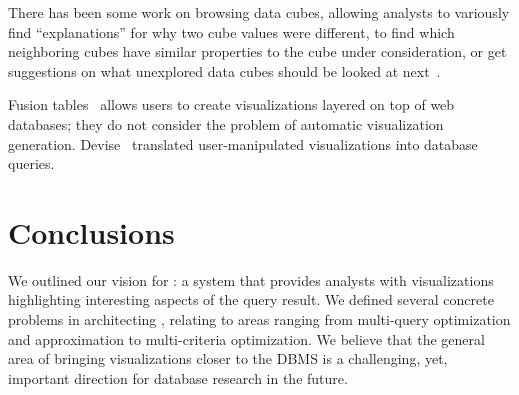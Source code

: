 \documentclass{sig-alternate}
\begin{document}
 There has been some work on browsing data cubes, allowing analysts to variously find ``explanations'' for why two cube values were different, to find which neighboring cubes have similar properties to the cube under consideration, or get suggestions on what unexplored data cubes should be looked at next~\cite{DBLP:conf/vldb/Sarawagi99, DBLP:conf/vldb/SatheS01, DBLP:conf/vldb/Sarawagi00}. 


 Fusion tables~\cite{DBLP:conf/sigmod/GonzalezHJLMSSG10} allows users to create visualizations layered on top of web databases; they do not consider the problem of automatic visualization generation. Devise~\cite{DBLP:conf/sigmod/LivnyRBCDLMW97} translated user-manipulated visualizations into database queries.  


\vspace{-3pt}
\section{Conclusions}\label{sec:conclusions}
\noindent We outlined our vision for \VizRecDB: a system that provides analysts with visualizations highlighting interesting aspects of the query result. We defined several concrete problems in architecting \VizRecDB, relating to areas ranging from multi-query optimization and approximation to multi-criteria optimization. We believe that the general area of bringing visualizations closer to the DBMS is a challenging, yet, important direction for database research in the future.


\vspace{-3pt}
{\scriptsize


}
\end{document}

